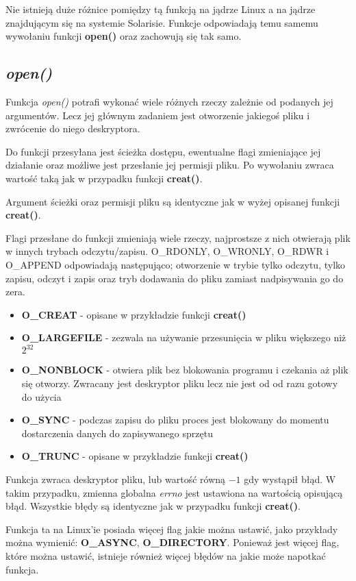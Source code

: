 \documentclass{article}
\begin{document}
Nie istnieją duże różnice pomiędzy tą funkcją na jądrze Linux a na jądrze znajdującym się na systemie Solarisie.
Funkcje odpowiadają temu samemu wywołaniu funkcji \textbf{open()} oraz zachowują się tak samo.

\subsection{\textit{open()}}
Funkcja \textit{open()} potrafi wykonać wiele różnych rzeczy zależnie od podanych jej argumentów.
Lecz jej głównym zadaniem jest otworzenie jakiegoś pliku i zwrócenie do niego deskryptora.

Do funkcji przesyłana jest ścieżka dostępu, ewentualne flagi zmieniające jej działanie oraz możliwe jest przesłanie jej permisji pliku.
Po wywołaniu zwraca wartość taką jak w przypadku funkcji \textbf{creat()}.

Argument ścieżki oraz permisji pliku są identyczne jak w wyżej opisanej funkcji \textbf{creat()}.

Flagi przesłane do funkcji zmieniają wiele rzeczy, najprostsze z nich otwierają plik w innych trybach odczytu/zapisu.
O\_RDONLY, O\_WRONLY, O\_RDWR i O\_APPEND odpowiadają następująco; otworzenie w trybie tylko odczytu, tylko zapisu, odczyt i zapis oraz tryb dodawania do pliku zamiast nadpisywania go do zera.

\begin{itemize}
\item \textbf{O\_CREAT} - opisane w przykładzie funkcji \textbf{creat()}
\item \textbf{O\_LARGEFILE} - zezwala na używanie przesunięcia w pliku większego niż $2^{32}$
\item \textbf{O\_NONBLOCK} - otwiera plik bez blokowania programu i czekania aż plik się otworzy. Zwracany jest deskryptor pliku lecz nie jest od od razu gotowy do użycia
\item \textbf{O\_SYNC} - podczas zapisu do pliku proces jest blokowany do momentu dostarczenia danych do zapisywanego sprzętu
\item \textbf{O\_TRUNC} - opisane w przykładzie funkcji \textbf{creat()}
\end{itemize}

Funkcja zwraca deskryptor pliku, lub wartość równą $-1$ gdy wystąpił błąd.
W takim przypadku, zmienna globalna \textit{errno} jest ustawiona na wartością opisującą błąd.
Wszystkie błędy są identyczne jak w przypadku funkcji \textbf{creat()}.

Funkcja ta na Linux'ie posiada więcej flag jakie można ustawić, jako przykłady można wymienić: \textbf{O\_ASYNC}, \textbf{O\_DIRECTORY}.
Ponieważ jest więcej flag, które można ustawić, istnieje również więcej błędów na jakie może napotkać funkcja. 
\end{document}

